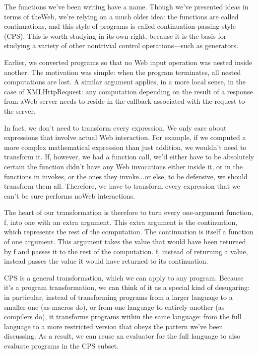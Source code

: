 
The functions we’ve been writing have a name. Though we’ve presented ideas in
terms of theWeb, we’re relying on a much older idea: the functions are called
continuations, and this style of programs is called continuation-passing style
(CPS). This is worth studying in its own right, because it is the basis for
studying a variety of other nontrivial control operations—such as generators.

Earlier, we converted programs so that no Web input operation was nested inside
another. The motivation was simple: when the program terminates, all nested
computations are lost. A similar argument applies, in a more local sense, in the
case of XMLHttpRequest: any computation depending on the result of a response
from aWeb server needs to reside in the callback associated with the request to
the server.

In fact, we don’t need to transform every expression. We only care about
expressions that involve actual Web interaction. For example, if we computed a
more complex mathematical expression than just addition, we wouldn’t need to
transform it. If, however, we had a function call, we’d either have to be
absolutely certain the function didn’t have any Web invocations either inside
it, or in the functions in invokes, or the ones they invoke...or else, to be
defensive, we should transform them all. Therefore, we have to transform every
expression that we can’t be sure performs noWeb interactions.

The heart of our transformation is therefore to turn every one-argument
function, f, into one with an extra argument. This extra argument is the
continuation, which represents the rest of the computation. The continuation is
itself a function of one argument. This argument takes the value that would have
been returned by f and passes it to the rest of the computation. f, instead of
returning a value, instead passes the value it would have returned to its
continuation.

CPS is a general transformation, which we can apply to any program. Because it’s
a program transformation, we can think of it as a special kind of desugaring: in
particular, instead of transforming programs from a larger language to a smaller
one (as macros do), or from one language to entirely another (as compilers do),
it transforms programs within the same language: from the full language to a
more restricted version that obeys the pattern we’ve been discussing. As a
result, we can reuse an evaluator for the full language to also evaluate
programs in the CPS subset.

\secdown



\secup
